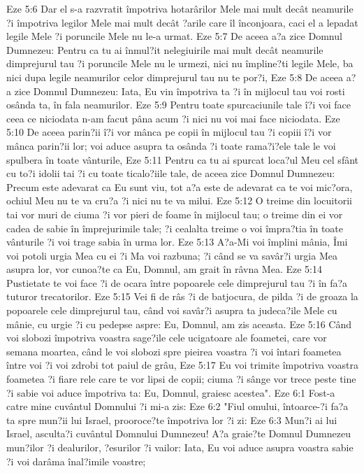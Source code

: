 Eze 5:6  Dar el s-a razvratit împotriva hotarârilor Mele mai mult decât neamurile ?i împotriva legilor Mele mai mult decât ?arile care îl înconjoara, caci el a lepadat legile Mele ?i poruncile Mele nu le-a urmat.
Eze 5:7  De aceea a?a zice Domnul Dumnezeu: Pentru ca tu ai înmul?it nelegiuirile mai mult decât neamurile dimprejurul tau ?i poruncile Mele nu le urmezi, nici nu împline?ti legile Mele, ba nici dupa legile neamurilor celor dimprejurul tau nu te por?i,
Eze 5:8  De aceea a?a zice Domnul Dumnezeu: Iata, Eu vin împotriva ta ?i în mijlocul tau voi rosti osânda ta, în fala neamurilor.
Eze 5:9  Pentru toate spurcaciunile tale î?i voi face ceea ce niciodata n-am facut pâna acum ?i nici nu voi mai face niciodata.
Eze 5:10  De aceea parin?ii î?i vor mânca pe copii în mijlocul tau ?i copiii î?i vor mânca parin?ii lor; voi aduce asupra ta osânda ?i toate rama?i?ele tale le voi spulbera în toate vânturile,
Eze 5:11  Pentru ca tu ai spurcat loca?ul Meu cel sfânt cu to?i idolii tai ?i cu toate ticalo?iile tale, de aceea zice Domnul Dumnezeu: Precum este adevarat ca Eu sunt viu, tot a?a este de adevarat ca te voi mic?ora, ochiul Meu nu te va cru?a ?i nici nu te va milui.
Eze 5:12  O treime din locuitorii tai vor muri de ciuma ?i vor pieri de foame în mijlocul tau; o treime din ei vor cadea de sabie în împrejurimile tale; ?i cealalta treime o voi împra?tia în toate vânturile ?i voi trage sabia în urma lor.
Eze 5:13  A?a-Mi voi împlini mânia, Îmi voi potoli urgia Mea cu ei ?i Ma voi razbuna; ?i când se va savâr?i urgia Mea asupra lor, vor cunoa?te ca Eu, Domnul, am grait în râvna Mea.
Eze 5:14  Pustietate te voi face ?i de ocara între popoarele cele dimprejurul tau ?i în fa?a tuturor trecatorilor.
Eze 5:15  Vei fi de râs ?i de batjocura, de pilda ?i de groaza la popoarele cele dimprejurul tau, când voi savâr?i asupra ta judeca?ile Mele cu mânie, cu urgie ?i cu pedepse aspre: Eu, Domnul, am zis aceasta.
Eze 5:16  Când voi slobozi împotriva voastra sage?ile cele ucigatoare ale foametei, care vor semana moartea, când le voi slobozi spre pieirea voastra ?i voi întari foametea între voi ?i voi zdrobi tot paiul de grâu,
Eze 5:17  Eu voi trimite împotriva voastra foametea ?i fiare rele care te vor lipsi de copii; ciuma ?i sânge vor trece peste tine ?i sabie voi aduce împotriva ta: Eu, Domnul, graiesc acestea".
Eze 6:1  Fost-a catre mine cuvântul Domnului ?i mi-a zis:
Eze 6:2  "Fiul omului, întoarce-?i fa?a ta spre mun?ii lui Israel, prooroce?te împotriva lor ?i zi:
Eze 6:3  Mun?i ai lui Israel, asculta?i cuvântul Domnului Dumnezeu! A?a graie?te Domnul Dumnezeu mun?ilor ?i dealurilor, ?esurilor ?i vailor: Iata, Eu voi aduce asupra voastra sabie ?i voi darâma înal?imile voastre;
